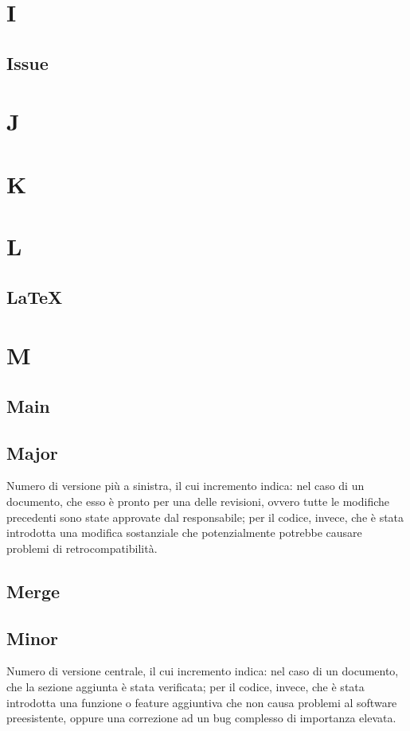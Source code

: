 \section{I}
    \subsection{Issue}
\section{J}
\section{K}
\section{L}
    \subsection{LaTeX}
\section{M}
    \subsection{Main}
    \subsection{Major}
    Numero di versione più a sinistra, il cui incremento indica: nel caso di un documento, che esso è pronto per una delle revisioni, ovvero tutte le modifiche precedenti sono state 
    approvate dal responsabile; per il codice, invece, che è stata introdotta una modifica sostanziale che potenzialmente potrebbe causare problemi di retrocompatibilità.
    \subsection{Merge}
    \subsection{Minor}
    Numero di versione centrale, il cui incremento indica: nel caso di un documento, che la sezione aggiunta è stata verificata; per il codice, invece, che è stata
    introdotta una funzione o feature aggiuntiva che non causa problemi al software preesistente, oppure una correzione ad un bug complesso di importanza elevata.

